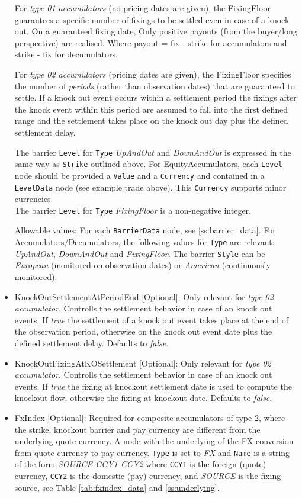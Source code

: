 \begin{itemize}
    For \emph{type 01 accumulators} (no pricing dates are given), the FixingFloor guarantees a specific number of
    fixings to be settled even in case of a knock out. On a guaranteed fixing date, Only positive payouts (from the
    buyer/long perspective) are realised. Where payout = fix - strike for accumulators and strike - fix for decumulators.

    For \emph{type 02 accumulators} (pricing dates are given), the FixingFloor specifies the number of {\em periods}
    (rather than observation dates) that are guaranteed to settle. If a knock out event occurs within a settlement
    period the fixings after the knock event within this period are assumed to fall into the first defined range and the
    settlement takes place on the knock out day plus the defined settlement delay.

    The barrier \lstinline!Level! for \lstinline!Type! \emph{UpAndOut} and \emph{DownAndOut} is expressed in the same way as \lstinline!Strike! outlined above. For EquityAccumulators, each \lstinline!Level! node should be provided a \lstinline!Value! and a \lstinline!Currency! and contained in a \lstinline!LevelData! node (see example trade above). This \lstinline!Currency! supports minor currencies. \\
    The barrier \lstinline!Level! for \lstinline!Type!  \emph{FixingFloor}  is a non-negative integer.

    Allowable values: For each \lstinline!BarrierData! node, see \ref{ss:barrier_data}. For Accumulators/Decumulators, the following values for \lstinline!Type! are relevant: \emph{UpAndOut}, \emph{DownAndOut} and \emph{FixingFloor}. The barrier \lstinline!Style! can be \emph{European} (monitored on observation dates) or \emph{American} (continuously monitored).
\item KnockOutSettlementAtPeriodEnd [Optional]: Only relevant for \emph{type 02 accumulator}. Controlls the settlement behavior in case of an knock out events. 
    If \emph{true} the settlement of a knock out event takes place at the end of the observation period, otherwise on the knock out event date plus the 
    defined settlement delay. Defaults to \emph{false}.
\item KnockOutFixingAtKOSettlement [Optional]: Only relevant for \emph{type 02 accumulator}. Controlls the settlement behavior in case of an knock out events. 
    If \emph{true} the fixing at knockout settlement date is used to compute the knockout flow, otherwise the fixing at knockout date. Defaults to \emph{false}.
\item FxIndex [Optional]: Required for composite accumulators of type 2, where the strike, knockout barrier and pay currency are different from the underlying quote currency. A node with the underlying of the FX conversion from quote currency to pay currency.
\lstinline!Type! is set to \emph{FX} and \lstinline!Name! is a string of the form \emph{SOURCE-CCY1-CCY2} where \lstinline!CCY1! is the foreign (quote) currency, \lstinline!CCY2! is the domestic (pay) currency, and \emph{SOURCE} is the fixing source, see Table \ref{tab:fxindex_data} and  \ref{ss:underlying}.
\end{itemize}

